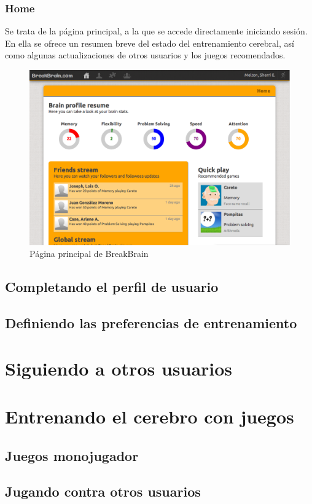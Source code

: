 \subsubsection{Home}

Se trata de la página principal, a la que se accede directamente iniciando sesión. En ella se ofrece un resumen breve del estado del entrenamiento cerebral, así como algunas actualizaciones de otros usuarios y los juegos recomendados.

\begin{figure}[h]
  \begin{center}
    \includegraphics[width=\textwidth]{./images/page-home.png}
  \end{center}  
  \caption{Página principal de BreakBrain}
  \label{fig::page-home}
\end{figure}

\subsection{Completando el perfil de usuario}

\subsection{Definiendo las preferencias de entrenamiento}

\section{Siguiendo a otros usuarios}

\section{Entrenando el cerebro con juegos}

\subsection{Juegos monojugador}

\subsection{Jugando contra otros usuarios}
